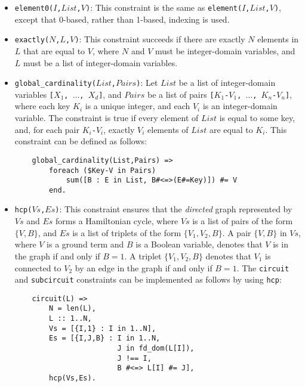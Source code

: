 \begin{itemize}
\item \texttt{element0($I$,$List$,$V$)}: This constraint is the same as \texttt{element($I$,$List$,$V$)}, except that 0-based, rather than 1-based, indexing is used.

\item \texttt{exactly($N$,$L$,$V$)}: This constraint succeeds if there are exactly $N$ elements in $L$ that are equal to $V$, where $N$ and $V$ must be integer-domain variables, and $L$ must be a list of integer-domain variables.

\item \texttt{global\_cardinality($List$,$Pairs$)}: Let $List$ be a list of integer-domain variables \texttt{[$X_1$, $\ldots$, $X_d$]}, and $Pairs$ be a list of pairs \texttt{[$K_1$-$V_1$, $\ldots$, $K_n$-$V_n$]}, where each key \texttt{$K_i$} is a unique integer, and each \texttt{$V_i$} is an integer-domain variable. The constraint is true if every element of $List$ is equal to some key, and, for each pair \texttt{$K_i$-$V_i$}, exactly \texttt{$V_i$} elements of $List$ are equal to \texttt{$K_i$}. This constraint can be defined as follows:
\begin{verbatim}
    global_cardinality(List,Pairs) =>
        foreach ($Key-V in Pairs) 
            sum([B : E in List, B#<=>(E#=Key)]) #= V
        end.
\end{verbatim}

\item \texttt{hcp($Vs$,$Es$)}: This constraint ensures that the \textit{directed} graph represented by $Vs$ and $Es$ forms a Hamiltonian cycle, where $Vs$ is a list of pairs of the form $\{V,B\}$, and $Es$ is a list of triplets of the form $\{V_1,V_2,B\}$. A pair $\{V,B\}$ in $Vs$, where $V$ is a ground term and $B$ is a Boolean variable, denotes that $V$ is in the graph if and only if $B = 1$. A triplet $\{V_1,V_2,B\}$ denotes that $V_1$ is connected to $V_2$  by an edge in the graph if and only if $B = 1$. The \texttt{circuit} and \texttt{subcircuit} constraints can be implemented as follows by using \texttt{hcp}:
\begin{verbatim}
    circuit(L) =>
        N = len(L),
        L :: 1..N,
        Vs = [{I,1} : I in 1..N],
        Es = [{I,J,B} : I in 1..N, 
                        J in fd_dom(L[I]), 
                        J !== I, 
                        B #<=> L[I] #= J],
        hcp(Vs,Es).


\end{verbatim}
\end{itemize}

